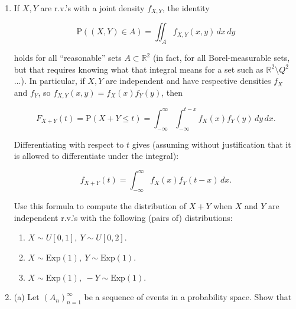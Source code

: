 \documentclass[11pt]{report}
\newcommand{\R}{\mathbb{R}}
\theoremstyle{plain}
\theoremstyle{definition}
\begin{document}
\begin{enumerate}[label=\arabic*.]
(b) Assume that $X \sim \textrm{Exp}(\lambda), Y \sim \textrm{Exp}(\mu)$ (and are independent as before). Prove that
$\min(X,Y)$ has distribution $\textrm{Exp}(\lambda+\mu)$. Try to give an intuitive explanation in terms of the kind of real-life phenomena that the exponential distribution is intended to model (e.g., measuring the time for a light-bulb to burn out, or for a radioactive particle to be emitted from a chunk of radioactive material).

(c) Let $X_1, X_2, \ldots$ be a sequence of independent r.v.'s, all of them having distribution $\textrm{Exp}(1)$. For each $n\ge1$ denote

\[
M_n = \max(X_1,X_2,\ldots,X_n) - \log n.
\]

Compute for each $n$ the distribution function of $M_n$, and find the limit (if it exists)

\[
F(x) = \lim_{n\to\infty} F_{M_n}(x).
\]
\item If $X,Y$ are r.v.'s with a joint density $f_{X,Y}$, the identity

\[
\mathrm{P}((X,Y) \in A) = \iint_A f_{X,Y}(x,y)\,dx\,dy
\]

holds for all ``reasonable'' sets $A\subset \R^2$ (in fact, for all Borel-measurable sets, but that requires knowing what that integral means for a set such as $\R^2\setminus Q^2$...). In particular, if $X,Y$ are independent and have respective densities $f_X$ and $f_Y$, so $f_{X,Y}(x,y)=f_X(x)f_Y(y)$, then

\[
F_{X+Y}(t) = \mathrm{P}(X+Y \le t) = \int_{-\infty}^\infty \int_{-\infty}^{t-x} f_{X}(x)f_Y(y)\,dy\,dx.
\]

Differentiating with respect to $t$ gives (assuming without justification that it is allowed to differentiate under the integral):

\[
f_{X+Y}(t) = \int_{-\infty}^\infty f_X(x)f_Y(t-x)\,dx.
\]

Use this formula to compute the distribution of $X+Y$ when $X$ and $Y$ are independent r.v.'s with the following (pairs of) distributions:

\begin{enumerate}[label=\arabic*.]
\item $X \sim U[0,1],\ Y \sim U[0,2]$.
\item $X \sim \textrm{Exp}(1),\ Y \sim \textrm{Exp}(1)$.
\item $X \sim \textrm{Exp}(1),\  -Y \sim \textrm{Exp}(1)$.
\end{enumerate}
\item (a) Let $(A_n)_{n=1}^\infty$ be a sequence of events in a probability space. Show that


\end{enumerate}
\end{document}
